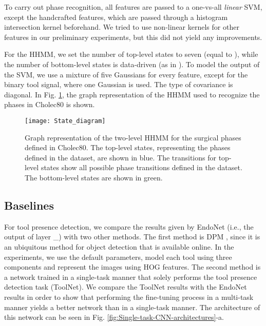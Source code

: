\documentclass[journal]{IEEEtran} \usepackage{amssymb}
\begin{document}
To carry out phase recognition, all features are passed to a one-vs-all \textit{linear} SVM, except the handcrafted features,
which are passed through a histogram intersection kernel beforehand. We tried
to use non-linear kernels for other features in our preliminary experiments,
but this did not yield any improvements. 

For the HHMM, we set the number of top-level states to seven (equal to ), while the number of bottom-level states is data-driven (as in \cite{padoy_cvw2009}). To model the output of the SVM, we use a mixture of five Gaussians for every feature, except for the binary tool signal, where one Gaussian is used. The type of covariance is diagonal. In Fig. \ref{fig:HHMM}, the graph representation of the HHMM used to recognize the phases in Cholec80 is shown. 

\begin{figure}
\begin{centering}
\texttt{[image: State\_diagram]}
\par\end{centering}

\caption{Graph representation of the two-level HHMM for the surgical phases defined in Cholec80. The top-level states, representing the phases defined in the dataset, are shown in blue. The transitions for top-level states show all possible phase transitions defined in the dataset. The bottom-level states are shown in green. \label{fig:HHMM} }
\end{figure}

\subsection{Baselines}

For tool presence detection, we compare the results given by
EndoNet (i.e., the output of layer \_)
with two other methods. The first method is DPM \cite{DPM}, since
it is an ubiquitous method for object detection that is available
online. 
In the experiments, we use the default parameters, model each tool using three components and represent the images using HOG features. The second method is a network trained in a single-task manner that solely performs the tool presence detection task (ToolNet). We compare the ToolNet results with the EndoNet results in order to show that performing the fine-tuning process in a multi-task manner yields a better network than in a single-task manner. The architecture of this network can be seen in Fig. \ref{fig:Single-task-CNN-architectures}-a. 
\end{document}

